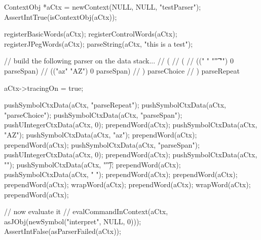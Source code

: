 

\startCTest
  ContextObj *aCtx = newContext(NULL, NULL, "testParser");
  AssertIntTrue(isContextObj(aCtx));
  
  registerBasicWords(aCtx);
  registerControlWords(aCtx);
  registerJPegWords(aCtx);
  parseString(aCtx, "this is a test");

  // build the following parser on the data stack...
  // ( 
  //   (
  //     ((" " "\t" "\n") 0 parseSpan)
  //     (("az" "AZ") 0 parseSpan)
  //   ) parseChoice
  // ) parseRepeat

  aCtx->tracingOn = true;

  pushSymbolCtxData(aCtx, "parseRepeat");
  pushSymbolCtxData(aCtx, "parseChoice");
  pushSymbolCtxData(aCtx, "parseSpan");
  pushUIntegerCtxData(aCtx, 0);
  prependWord(aCtx);
  pushSymbolCtxData(aCtx, "AZ");
  pushSymbolCtxData(aCtx, "az");
  prependWord(aCtx);
  prependWord(aCtx);
  pushSymbolCtxData(aCtx, "parseSpan");
  pushUIntegerCtxData(aCtx, 0);
  prependWord(aCtx);
  pushSymbolCtxData(aCtx, "\n");
  pushSymbolCtxData(aCtx, "\t");
  prependWord(aCtx);
  pushSymbolCtxData(aCtx, " ");
  prependWord(aCtx);
  prependWord(aCtx);
  prependWord(aCtx);
  wrapWord(aCtx);
  prependWord(aCtx);
  wrapWord(aCtx);
  prependWord(aCtx);
  
  // now evaluate it
//  evalCommandInContext(aCtx, asJObj(newSymbol("interpret", NULL, 0)));
  AssertIntFalse(asParserFailed(aCtx));
\stopCTest
\skipTestCase
\stopTestSuite